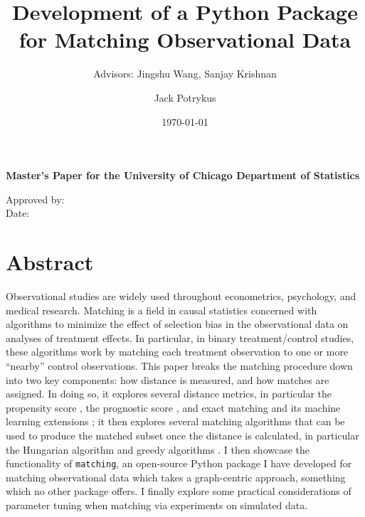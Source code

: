 \documentclass[11pt]{extarticle}
\title{Development of a Python Package for Matching Observational Data}
\subtitle{{\Large Advisors: Jingshu Wang, Sanjay Krishnan}}
\author{Jack Potrykus}
\date{\today}
\begin{document}
\begin{center}{\large \bfseries Master’s Paper for the University of Chicago Department of Statistics}\end{center}
\vspace{5cm}

{\let\newpage\relax\maketitle}



\vfill{\null}
{\Large 
  Approved by:~\hrulefill\vspace{0.5cm}\\%
  Date:~\hrulefill%
}
\newpage{}

\section*{Abstract}
\label{sec:abstract}

Observational studies are widely used throughout econometrics, psychology, and medical research.
Matching is a field in causal statistics concerned with algorithms to minimize the effect of selection bias in the observational data on analyses of treatment effects.
In particular, in binary treatment/control studies, these algorithms work by matching each treatment observation to one or more ``nearby'' control observations.
This paper breaks the matching procedure down into two key components: how distance is measured, and how matches are assigned.
In doing so, it explores several distance metrics, in particular the propensity score \parencite{rosenbaum_central_1983}, the prognostic score \parencite{hansen_prognostic_2008}, and exact matching \parencite{iacus_causal_2012} and its machine learning extensions \parencite{liu_interpretable_2019, wang_flame_2021}; it then explores several matching algorithms that can be used to produce the matched subset once the distance is calculated, in particular the Hungarian algorithm \parencite{munkres_algorithms_1957} and greedy algorithms \parencite{ho_matchit_2011}.
I then showcase the functionality of \texttt{matching}, an open-source Python package I have developed for matching observational data which takes a graph-centric approach, something which no other package offers.
I finally explore some practical considerations of parameter tuning when matching via experiments on simulated data.
\end{document}
